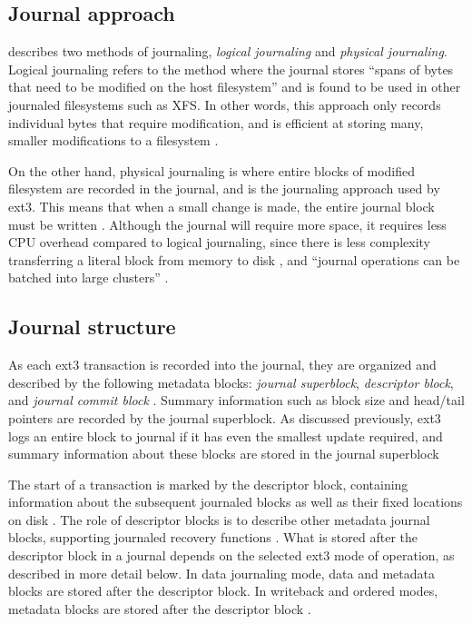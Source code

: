 \subsection{Journal approach}

\citet[p. 3]{Robbins2001a} describes two methods of journaling, \emph{logical journaling} and \emph{physical journaling}. Logical journaling refers to the method where the journal stores ``spans of bytes that need to be modified on the host filesystem'' and is found to be used in other journaled filesystems such as XFS. In other words, this approach only records individual bytes that require modification, and is efficient at storing many, smaller modifications to a filesystem \citep{Robbins2001a}.

On the other hand, physical journaling is where entire blocks of modified filesystem are recorded in the journal, and is the journaling approach used by ext3. This means that when a small change is made, the entire journal block must be written \citep{Bovet2006, Robbins2001a}. Although the journal will require more space, it requires less CPU overhead compared to logical journaling, since there is less complexity transferring a literal block from memory to disk \citep{Robbins2001a}, and ``journal operations can be batched into large clusters'' \citep[p. 55]{Galli2001}.

\subsection{Journal structure}

As each ext3 transaction is recorded into the journal, they are organized and described by the following metadata blocks: \emph{journal superblock}, \emph{descriptor block}, and \emph{journal commit block} \citep{Prabhakaran2005a}. Summary information such as block size and head/tail pointers are recorded by the journal superblock. As discussed previously, ext3 logs an entire block to journal if it has even the smallest update required, and summary information about these blocks are stored in the journal superblock \citep{Prabhakaran2005a, Galli2001}

The start of a transaction is marked by the descriptor block, containing information about the subsequent journaled blocks as well as their fixed locations on disk \citep{Prabhakaran2005a}. The role of descriptor blocks is to describe other metadata journal blocks, supporting journaled recovery functions \citep{Galli2001, Tweedie1998}. What is stored after the descriptor block in a journal depends on the selected ext3 mode of operation, as described in more detail below. In data journaling mode, data and metadata blocks are stored after the descriptor block. In writeback and ordered modes, metadata blocks are stored after the descriptor block \citep{Prabhakaran2005a}.

